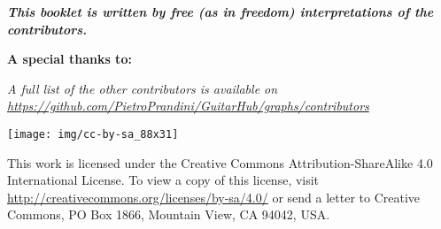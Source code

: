 % 
% 
% 
% 

\begin{center}
	{\textit{\textbf{This booklet is written by free (as in freedom) interpretations of the contributors.}}}\par
\end{center}
\begin{center}
	\textbf{A special thanks to:}
	
\end{center}
\begin{center}
	{\textit{\footnotesize{A full list of the other contributors is available on \href{https://github.com/PietroPrandini/GuitarHub/graphs/contributors}{https://github.com/PietroPrandini/GuitarHub/graphs/contributors}}}}\par
\end{center}
\begin{center}
	\texttt{[image: img/cc-by-sa\_88x31]} \par
	{\footnotesize{This work is licensed under the Creative Commons Attribution-ShareAlike 4.0 International License. To view a copy of this license, visit \href{http://creativecommons.org/licenses/by-sa/4.0/}{http://creativecommons.org/licenses/by-sa/4.0/} or send a letter to Creative Commons, PO Box 1866, Mountain View, CA 94042, USA.}}\par
\medskip
{}
\end{center}
\newpage
